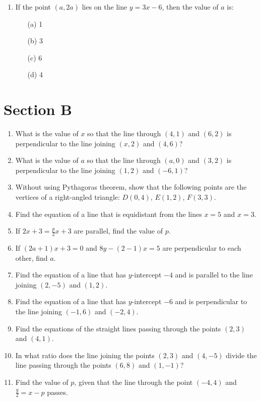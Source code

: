 \documentclass[12pt]{article}
\begin{document}
\begin{multicols}{2}
\begin{enumerate}
	\item If the point \( (a, 2a) \) lies on the line \( y = 3x - 6 \), then the value of \( a \) is:
	\begin{itemize}
		\item[(a)] 1
		\item[(b)] 3
		\item[(c)] 6
		\item[(d)] 4
	\end{itemize}
\end{enumerate}
		\section*{Section B}
	\begin{enumerate}
		\item What is the value of \( x \) so that the line through \( (4, 1) \) and \( (6, 2) \) is perpendicular to the line joining \( (x, 2) \) and \( (4, 6) \)?
		\item What is the value of \( a \) so that the line through \( (a, 0) \) and \( (3, 2) \) is perpendicular to the line joining \( (1, 2) \) and \( (-6, 1) \)?
		\item Without using Pythagoras theorem, show that the following points are the vertices of a right-angled triangle: \( D(0, 4) \), \( E(1, 2) \), \( F(3, 3) \).
		\item Find the equation of a line that is equidistant from the lines \( x = 5 \) and \( x = 3 \).
		\item If \( 2x + 3 = \frac{p}{2}x + 3 \) are parallel, find the value of \( p \).
		\item If \( (2a + 1)x + 3 = 0 \) and \( 8y - (2 - 1)x = 5 \) are perpendicular to each other, find \( a \).
		\item Find the equation of a line that has \( y \)-intercept \(-4\) and is parallel to the line joining \( (2, -5) \) and \( (1, 2) \).
		\item Find the equation of a line that has \( y \)-intercept \(-6\) and is perpendicular to the line joining \( (-1, 6) \) and \( (-2, 4) \).
		\item Find the equations of the straight lines passing through the points \( (2, 3) \) and \( (4, 1) \).
		\item In what ratio does the line joining the points \( (2, 3) \) and \( (4, -5) \) divide the line passing through the points \( (6, 8) \) and \( (1, -1) \)?
		\item Find the value of \( p \), given that the line through the point \( (-4, 4) \) and \( \frac{y}{2} = x - p \) passes.

\end{enumerate}
\end{multicols}
\end{document}
